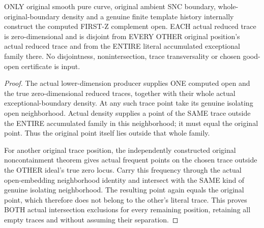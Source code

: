 \begin{theorem}
\label{hir:sharp-original-curve-first-good-disjoint-traces-exceptional-avoidance}
\leanok
ONLY original smooth pure curve, original ambient SNC boundary,
whole-original-boundary density and a genuine finite template history
internally construct the computed FIRST-Z complement open. EACH actual
reduced trace is zero-dimensional and is disjoint from EVERY OTHER
original position's actual reduced trace and from the ENTIRE literal
accumulated exceptional family there. No disjointness, nonintersection,
trace transversality or chosen good-open certificate is input.
\end{theorem}
\begin{proof}
The actual lower-dimension producer supplies ONE computed open and the
true zero-dimensional reduced traces, together with their whole actual
exceptional-boundary density. At any such trace point take its genuine
isolating open neighborhood. Actual density supplies a point of the
SAME trace outside the ENTIRE accumulated family in this neighborhood;
it must equal the original point. Thus the original point itself lies
outside that whole family.

For another original trace position, the independently constructed
original noncontainment theorem gives actual frequent points on the
chosen trace outside the OTHER ideal's true zero locus. Carry this
frequency through the actual open-embedding neighborhood identity and
intersect with the SAME kind of genuine isolating neighborhood. The
resulting point again equals the original point, which therefore does
not belong to the other's literal trace. This proves BOTH actual
intersection exclusions for every remaining position, retaining all
empty traces and without assuming their separation.
\end{proof}

